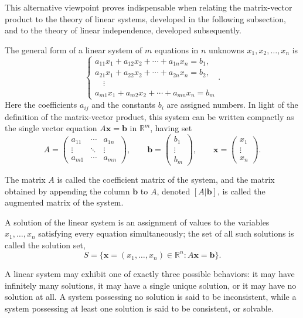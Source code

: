 This alternative viewpoint proves indispensable when relating the matrix-vector product to the theory of linear systems, developed in the following subsection, and to the theory of linear independence, developed subsequently.

The general form of a linear system of $m$ equations in $n$ unknowns $x_1, x_2, \dots, x_n$ is
\[
\begin{cases}
a_{11} x_1 + a_{12} x_2 + \cdots + a_{1n} x_n = b_1, \\
a_{21} x_1 + a_{22} x_2 + \cdots + a_{2n} x_n = b_2, \\
\quad \vdots \\
a_{m1} x_1 + a_{m2} x_2 + \cdots + a_{mn} x_n = b_m
\end{cases}.
\]
Here the coefficients $a_{ij}$ and the constants $b_i$ are assigned numbers. In light of the definition of the matrix-vector product, this system can be written compactly as the single vector equation $A\mathbf{x} = \mathbf{b}$ in $\mathbb{R}^m$, having set
\[
A = \begin{pmatrix} a_{11} & \cdots & a_{1n} \\ \vdots & \ddots & \vdots \\ a_{m1} & \cdots & a_{mn} \end{pmatrix}, \qquad
\mathbf{b} = \begin{pmatrix} b_1 \\ \vdots \\ b_m \end{pmatrix}, \qquad
\mathbf{x} = \begin{pmatrix} x_1 \\ \vdots \\ x_n \end{pmatrix}.
\]

The matrix $A$ is called the coefficient matrix of the system, and the matrix obtained by appending the column $\mathbf{b}$ to $A$, denoted $[A | \mathbf{b}]$, is called the augmented matrix of the system.

A solution of the linear system is an assignment of values to the variables $x_1, \dots, x_n$ satisfying every equation simultaneously; the set of all such solutions is called the solution set,
\[
S = \{ \mathbf{x} = (x_1, \dots, x_n) \in \mathbb{R}^n : A\mathbf{x} = \mathbf{b} \}.
\]

A linear system may exhibit one of exactly three possible behaviors: it may have infinitely many solutions, it may have a single unique solution, or it may have no solution at all. A system possessing no solution is said to be inconsistent, while a system possessing at least one solution is said to be consistent, or solvable.

